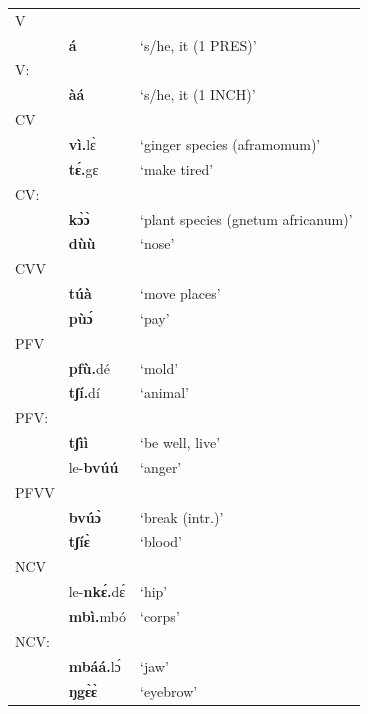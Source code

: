\begin{tabular}{lll}
V & & \\
  & {\bfseries á} & `s/he, it (1 PRES)' \\
V: & & \\
   & {\bfseries àá} & `s/he, it (1 INCH)' \\
CV & & \\
   & {\bfseries vì.}lɛ̀ & `ginger species (aframomum)' \\
   & {\bfseries tɛ́.}gɛ & `make tired' \\
CV: & & \\
  & {\bfseries kɔ̀ɔ̀} & `plant species (gnetum africanum)' \\
  & {\bfseries dùù} & `nose' \\
CVV & & \\
   & {\bfseries túà} & `move places' \\
   & {\bfseries pùɔ́} & `pay' \\

PFV & & \\
     & {\bfseries pfù.}dé & `mold' \\
     & {\bfseries tʃí.}dí & `animal' \\
PFV: & & \\
     & {\bfseries tʃìì} & `be well, live' \\
     & le-{\bfseries bvúú} & `anger' \\
PFVV & & \\
     & {\bfseries bvúɔ̀} & `break (intr.)' \\
     & {\bfseries tʃíɛ̀} & `blood' \\

NCV & & \\
   & le-{\bfseries nkɛ́.}dɛ́ & `hip' \\
   & {\bfseries mbì.}mbó & `corps' \\
NCV: & & \\
   & {\bfseries mbáá.}lɔ́ & `jaw' \\
   & {\bfseries ŋgɛ̀ɛ̀} & `eyebrow' \\
\end{tabular}

